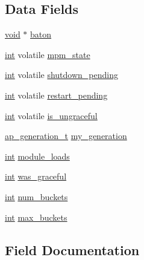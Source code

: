 \subsection*{Data Fields}
\begin{DoxyCompactItemize}
\item 
\hyperlink{group__MOD__ISAPI_gacd6cdbf73df3d9eed42fa493d9b621a6}{void} $\ast$ \hyperlink{structap__unixd__mpm__retained__data_a9559a0caea6c71f2032362b8d6fccb9a}{baton}
\item 
\hyperlink{pcre_8txt_a42dfa4ff673c82d8efe7144098fbc198}{int} volatile \hyperlink{structap__unixd__mpm__retained__data_aca6ac972630b9be48a845aab2ed27571}{mpm\+\_\+state}
\item 
\hyperlink{pcre_8txt_a42dfa4ff673c82d8efe7144098fbc198}{int} volatile \hyperlink{structap__unixd__mpm__retained__data_afabf37de3a13160b2137731cf3e0e5f2}{shutdown\+\_\+pending}
\item 
\hyperlink{pcre_8txt_a42dfa4ff673c82d8efe7144098fbc198}{int} volatile \hyperlink{structap__unixd__mpm__retained__data_a37f552ff16fbb8739374811283a1e250}{restart\+\_\+pending}
\item 
\hyperlink{pcre_8txt_a42dfa4ff673c82d8efe7144098fbc198}{int} volatile \hyperlink{structap__unixd__mpm__retained__data_a2ab0cb7e37da6f72d08f8cb16fa205e1}{is\+\_\+ungraceful}
\item 
\hyperlink{scoreboard_8h_a36af569e52dd926cc530df071af3d939}{ap\+\_\+generation\+\_\+t} \hyperlink{structap__unixd__mpm__retained__data_ad6a8c26f219f9b38c7e8ba14b8b124fa}{my\+\_\+generation}
\item 
\hyperlink{pcre_8txt_a42dfa4ff673c82d8efe7144098fbc198}{int} \hyperlink{structap__unixd__mpm__retained__data_a3a4932d20a1495c3badbce65e311d552}{module\+\_\+loads}
\item 
\hyperlink{pcre_8txt_a42dfa4ff673c82d8efe7144098fbc198}{int} \hyperlink{structap__unixd__mpm__retained__data_a32217b5b6d7298bd9ee6d1df7430b808}{was\+\_\+graceful}
\item 
\hyperlink{pcre_8txt_a42dfa4ff673c82d8efe7144098fbc198}{int} \hyperlink{structap__unixd__mpm__retained__data_a1ecbffa4dd3e5005d30cf5f823044d46}{num\+\_\+buckets}
\item 
\hyperlink{pcre_8txt_a42dfa4ff673c82d8efe7144098fbc198}{int} \hyperlink{structap__unixd__mpm__retained__data_a4a23661ac323c571ad7582a28f7b4519}{max\+\_\+buckets}
\end{DoxyCompactItemize}


\subsection{Field Documentation}
